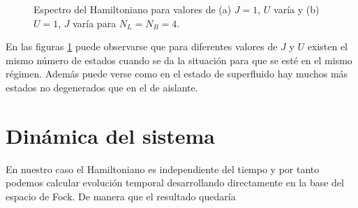 \documentclass[11pt,a4paper]{article}
\begin{document}
\begin{figure} [h]
 \centering
  \caption{Espectro del Hamiltoniano para valores de (a) $J=1$, $U$ varía y (b) $U=1$, $J$ varía para $N_L=N_B=4$.}
 \label{f:comparacion}
\end{figure}


En las figuras \ref{f:comparacion} puede observarse que para diferentes valores de $J$ y $U$ existen el mismo número de estados cuando se da la situación para que se esté en el mismo régimen. Además puede verse como en el estado de superfluido hay muchos más estados no degenerados que en el de aislante.

\section{Dinámica del sistema}

En nuestro caso el Hamiltoniano es independiente del tiempo y por tanto podemos calcular evolución temporal desarrollando directamente en la base del espacio de Fock. De manera que el resultado quedaría
\end{document}
